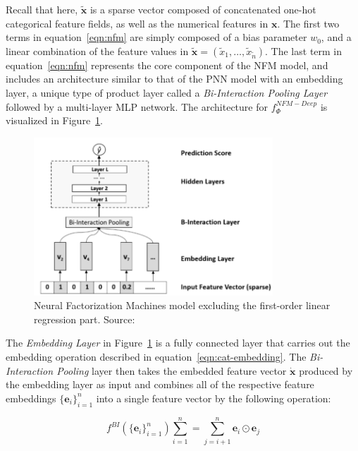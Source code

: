 \documentclass{mldsmsc}
\begin{document}
Recall that here, $\tilde{\mathbf{x}}$ is a sparse vector composed of concatenated one-hot
categorical feature fields, as well as the numerical features in $\mathbf{x}$.
The first two terms in equation~\ref{eqn:nfm} are simply composed of a
bias parameter $w_0$, and a linear combination of the feature values
in $\tilde{\mathbf{x}} = \left(\tilde{x}_1, \ldots, \tilde{x}_{\tilde{n}}\right)$.
The last term in equation~\ref{eqn:nfm} represents the core component of the NFM
model, and includes an architecture similar to that of the PNN model with
an embedding layer, a unique type of product layer called a \emph{Bi-Interaction Pooling Layer}
followed by a multi-layer MLP network. The architecture for $f_{\Phi}^{NFM-Deep}$
is visualized in Figure~\ref{fig:nfm}.

\begin{figure}[h]
    \centering
    \includegraphics[width=0.8\textwidth]{../figures/nfm.png}
    \caption{Neural Factorization Machines model excluding the first-order linear regression part. Source:\cite{RefWorks:he2017neural}}
    \label{fig:nfm}
\end{figure}

The \emph{Embedding Layer} in Figure~\ref{fig:nfm} is a fully connected layer that carries
out the embedding operation described in equation~\ref{eqn:cat-embedding}. The \emph{Bi-Interaction Pooling}
layer then takes the embedded feature vector $\dot{\mathbf{x}}$ produced by the embedding layer as
input and combines all of the respective feature embeddings $\{\mathbf{e}_i\}_{i=1}^{n}$ into a single feature
vector by the following operation:

\begin{equation}\label{eqn:bi-interaction-pooling}
    f^{BI}(\{\mathbf{e}_i\}_{i=1}^{n})\sum_{i=1}^{n} = \sum_{j=i+1}^{n} \mathbf{e}_i \odot \mathbf{e}_j
\end{equation}
\end{document}
